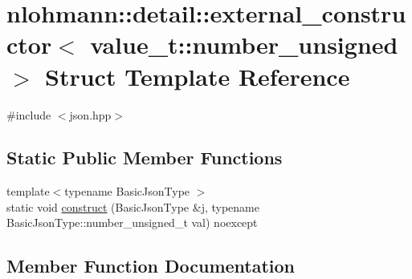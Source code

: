 \hypertarget{structnlohmann_1_1detail_1_1external__constructor_3_01value__t_1_1number__unsigned_01_4}{}\section{nlohmann\+::detail\+::external\+\_\+constructor$<$ value\+\_\+t\+::number\+\_\+unsigned $>$ Struct Template Reference}
\label{structnlohmann_1_1detail_1_1external__constructor_3_01value__t_1_1number__unsigned_01_4}


{\ttfamily \#include $<$json.\+hpp$>$}

\subsection*{Static Public Member Functions}
\begin{DoxyCompactItemize}
\item 
{\footnotesize template$<$typename Basic\+Json\+Type $>$ }\\static void \mbox{\hyperlink{structnlohmann_1_1detail_1_1external__constructor_3_01value__t_1_1number__unsigned_01_4_a17969b14852f43e04353858c87b0f539}{construct}} (Basic\+Json\+Type \&j, typename Basic\+Json\+Type\+::number\+\_\+unsigned\+\_\+t val) noexcept
\end{DoxyCompactItemize}


\subsection{Member Function Documentation}
\mbox{\label{structnlohmann_1_1detail_1_1external__constructor_3_01value__t_1_1number__unsigned_01_4_a17969b14852f43e04353858c87b0f539}} 
